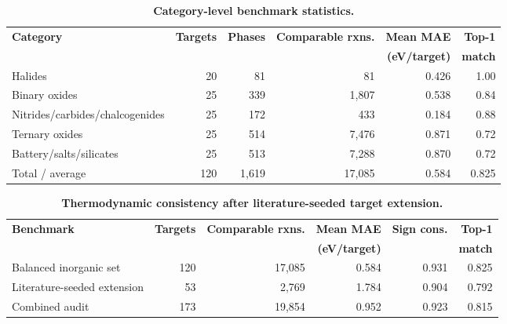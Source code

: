 \documentclass[11pt, letterpaper]{article}
\begin{document}
\begin{table}[p]
\centering
\small
\caption{\textbf{Category-level benchmark statistics.}}
\begin{tabular}{lrrrrr}
\toprule
\textbf{Category} & \textbf{Targets} & \textbf{Phases} & \textbf{Comparable rxns.} & \textbf{Mean MAE} & \textbf{Top-1} \\
 & & & & \textbf{(eV/target)} & \textbf{match} \\
\midrule
Halides & 20 & 81 & 81 & 0.426 & 1.00 \\
Binary oxides & 25 & 339 & 1,807 & 0.538 & 0.84 \\
Nitrides/carbides/chalcogenides & 25 & 172 & 433 & 0.184 & 0.88 \\
Ternary oxides & 25 & 514 & 7,476 & 0.871 & 0.72 \\
Battery/salts/silicates & 25 & 513 & 7,288 & 0.870 & 0.72 \\
\midrule
Total / average & 120 & 1,619 & 17,085 & 0.584 & 0.825 \\
\bottomrule
\end{tabular}
\label{supp-tab:category_stats}
\end{table}

\begin{table}[p]
\centering
\small
\caption{\textbf{Thermodynamic consistency after literature-seeded target extension.}}
\begin{tabular}{lrrrrr}
\toprule
\textbf{Benchmark} & \textbf{Targets} & \textbf{Comparable rxns.} & \textbf{Mean MAE} & \textbf{Sign cons.} & \textbf{Top-1} \\
 & & & \textbf{(eV/target)} & & \textbf{match} \\
\midrule
Balanced inorganic set & 120 & 17,085 & 0.584 & 0.931 & 0.825 \\
Literature-seeded extension & 53 & 2,769 & 1.784 & 0.904 & 0.792 \\
\midrule
Combined audit & 173 & 19,854 & 0.952 & 0.923 & 0.815 \\
\bottomrule
\end{tabular}
\label{supp-tab:extended_benchmark}
\end{table}
\end{document}
